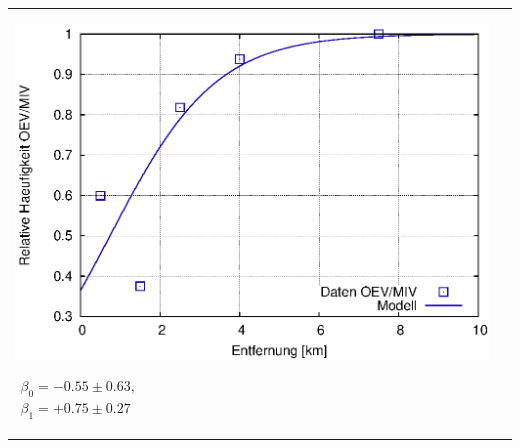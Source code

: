 \begin{landscape}
\begin{center}
\begin{tabular}{ll}
\parbox{1.00\textwidth}{
\includegraphics[width=1.0\textwidth]{figsRegr/revealedChoiceWS1516cum_2al_fProb_r.eps}
}
\parbox{0.30\textwidth}{
 {\small
 $
 \begin{array}{l}
 \beta_0=-0.55\pm 0.63, \\
 \beta_1=+0.75\pm 0.27
 \end{array}
 $
}}
\end{tabular}



\end{center}
\end{landscape}

